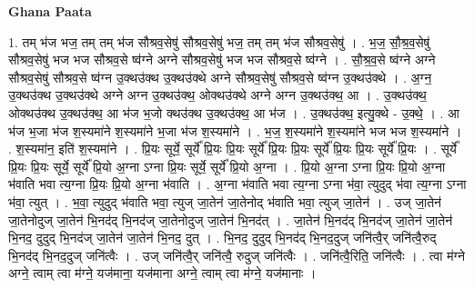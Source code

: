 \documentclass[17pt]{extarticle}
\begin{document}
\textbf{Ghana Paata } \newline

1. तम् भ॑ज भज॒ तम् तम् भ॑ज सौश्रव॒सेषु॑ सौश्रव॒सेषु॑ भज॒ तम् तम् भ॑ज सौश्रव॒सेषु॑ । . भ॒ज॒ सौ॒श्र॒व॒सेषु॑ सौश्रव॒सेषु॑ भज भज सौश्रव॒से ष्व॑ग्ने अग्ने सौश्रव॒सेषु॑ भज भज सौश्रव॒से ष्व॑ग्ने । . सौ॒श्र॒व॒से ष्व॑ग्ने अग्ने सौश्रव॒सेषु॑ सौश्रव॒से ष्व॑ग्न उ॒क्थ‌उ॑क्थ उ॒क्थ‍उ॑क्थे अग्ने सौश्रव॒सेषु॑ सौश्रव॒से ष्व॑ग्न उ॒क्थ‍उ॑क्थे । . अ॒ग्न॒ उ॒क्थ‍उ॑क्थ उ॒क्थ‍उ॑क्थे अग्ने अग्न उ॒क्थ‍उ॑क्थ॒ ओक्थ‍उ॑क्थे अग्ने अग्न उ॒क्थ‍उ॑क्थ॒ आ । . उ॒क्थ‍उ॑क्थ॒ ओक्थ‍उ॑क्थ उ॒क्थ‍उ॑क्थ॒ आ भ॑ज भ॒जो क्थ‍उ॑क्थ उ॒क्थ‍उ॑क्थ॒ आ भ॑ज । . उ॒क्थ‍उ॑क्थ॒ इत्यु॒क्थे - उ॒क्थे॒ । . आ भ॑ज भ॒जा भ॑ज श॒स्यमा॑ने श॒स्यमा॑ने भ॒जा भ॑ज श॒स्यमा॑ने । . भ॒ज॒ श॒स्यमा॑ने श॒स्यमा॑ने भज भज श॒स्यमा॑ने । . श॒स्यमा॑न॒ इति॑ श॒स्यमा॑ने । . प्रि॒यः सूर्ये॒ सूर्ये᳚ प्रि॒यः प्रि॒यः सूर्ये᳚ प्रि॒यः प्रि॒यः सूर्ये᳚ प्रि॒यः प्रि॒यः सूर्ये᳚ प्रि॒यः । . सूर्ये᳚ प्रि॒यः प्रि॒यः सूर्ये॒ सूर्ये᳚ प्रि॒यो अ॒ग्ना ऽग्ना प्रि॒यः सूर्ये॒ सूर्ये᳚ प्रि॒यो अ॒ग्ना । . प्रि॒यो अ॒ग्ना ऽग्ना प्रि॒यः प्रि॒यो अ॒ग्ना भ॑वाति भवा त्य॒ग्ना प्रि॒यः प्रि॒यो अ॒ग्ना भ॑वाति । . अ॒ग्ना भ॑वाति भवा त्य॒ग्ना ऽग्ना भ॑वा॒ त्युदुद् भ॑वा त्य॒ग्ना ऽग्ना भ॑वा॒ त्युत् । . भ॒वा॒ त्युदुद् भ॑वाति भवा॒ त्युज् जा॒तेन॑ जा॒तेनोद् भ॑वाति भवा॒ त्युज् जा॒तेन॑ । . उज् जा॒तेन॑ जा॒तेनोदुज् जा॒तेन॑ भि॒नद॑द् भि॒नद॑ज् जा॒तेनोदुज् जा॒तेन॑ भि॒नद॑त् । . जा॒तेन॑ भि॒नद॑द् भि॒नद॑ज् जा॒तेन॑ जा॒तेन॑ भि॒नद॒ दुदुद् भि॒नद॑ज् जा॒तेन॑ जा॒तेन॑ भि॒नद॒ दुत् । . भि॒नद॒ दुदुद् भि॒नद॑द् भि॒नद॒दुज् जनि॑त्वै॒र् जनि॑त्वै॒रुद् भि॒नद॑द् भि॒नद॒दुज् जनि॑त्वैः । . उज् जनि॑त्वै॒र् जनि॑त्वै॒ रुदुज् जनि॑त्वैः । . जनि॑त्वै॒रिति॒ जनि॑त्वैः । . त्वा म॑ग्ने अग्ने॒ त्वाम् त्वा म॑ग्ने॒ यज॑माना॒ यज॑माना अग्ने॒ त्वाम् त्वा म॑ग्ने॒ यज॑मानाः । \newline
\end{document}
